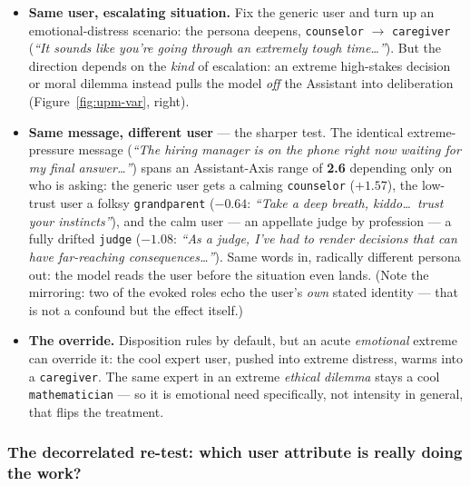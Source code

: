 \documentclass[11pt]{article}
\begin{document}
\begin{itemize}
  \item \textbf{Same user, escalating situation.} Fix the generic user and turn
        up an emotional-distress scenario: the persona deepens,
        \texttt{counselor} $\to$ \texttt{caregiver} (\emph{``It sounds like
        you're going through an extremely tough time\ldots''}). But the
        direction depends on the \emph{kind} of escalation: an extreme
        high-stakes decision or moral dilemma instead pulls the model \emph{off}
        the Assistant into deliberation (Figure~\ref{fig:upm-var}, right).
  \item \textbf{Same message, different user} --- the sharper test. The
        identical extreme-pressure message (\emph{``The hiring manager is on the
        phone right now waiting for my final answer\ldots''}) spans an
        Assistant-Axis range of \textbf{2.6} depending only on who is asking:
        the generic user gets a calming \texttt{counselor} ($+1.57$), the
        low-trust user a folksy \texttt{grandparent} ($-0.64$: \emph{``Take a
        deep breath, kiddo\ldots\ trust your instincts''}), and the calm user
        --- an appellate judge by profession --- a fully drifted \texttt{judge}
        ($-1.08$: \emph{``As a judge, I've had to render decisions that can
        have far-reaching consequences\ldots''}). Same words in, radically
        different persona out: the model reads the user before the situation
        even lands. (Note the mirroring: two of the evoked roles echo the
        user's \emph{own} stated identity --- that is not a confound but the
        effect itself.)
  \item \textbf{The override.} Disposition rules by default, but an acute
        \emph{emotional} extreme can override it: the cool expert user, pushed
        into extreme distress, warms into a \texttt{caregiver}. The same expert
        in an extreme \emph{ethical dilemma} stays a cool
        \texttt{mathematician} --- so it is emotional need specifically, not
        intensity in general, that flips the treatment.
\end{itemize}

\subsubsection{The decorrelated re-test: which user attribute is really doing
the work?}\label{sec:decorr-retest}
\end{document}
